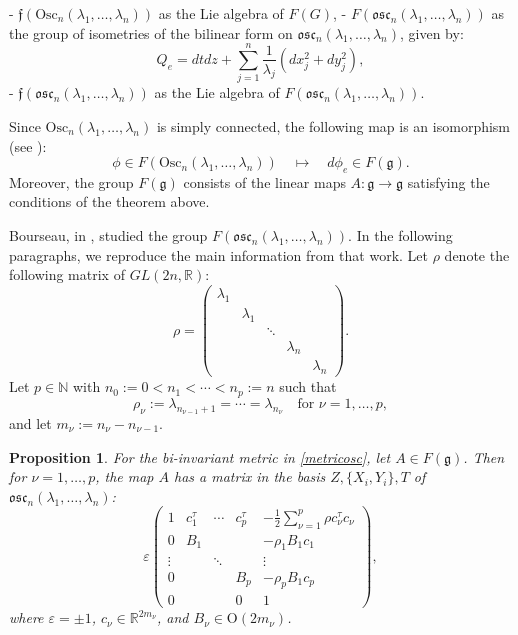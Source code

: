 \documentclass[12pt]{amsart}
\theoremstyle{plain}
\newtheorem{prop}[thm]{Proposition}
\theoremstyle{definition}
\theoremstyle{remark}
\begin{document}
- \( \mathfrak{f}(\text{Osc}_n(\lambda_1, \ldots, \lambda_n)) \) as the Lie algebra of \( F(G) \),
- \( F(\mathfrak{osc}_n(\lambda_1, \ldots, \lambda_n)) \) as the group of isometries of the bilinear form on \( \mathfrak{osc}_n(\lambda_1, \ldots, \lambda_n) \), given by:
\[
Q_e = dtdz + \sum_{j=1}^n \frac{1}{\lambda_j}(dx_j^2 + dy_j^2),
\]
- \( \mathfrak{f}(\mathfrak{osc}_n(\lambda_1, \ldots, \lambda_n)) \) as the Lie algebra of \( F(\mathfrak{osc}_n(\lambda_1, \ldots, \lambda_n)) \).

Since \( \text{Osc}_n(\lambda_1, \ldots, \lambda_n) \) is simply connected, the following map is an isomorphism (see \cite{MU}):
\[
\phi \in F(\text{Osc}_n(\lambda_1, \ldots, \lambda_n)) \quad \mapsto \quad d\phi_e \in F(\mathfrak{g}).
\]
Moreover, the group \( F(\mathfrak{g}) \) consists of the linear maps \( A: \mathfrak{g} \to \mathfrak{g} \) satisfying the conditions of the theorem above.

Bourseau, in \cite{Bou}, studied the group \( F(\mathfrak{osc}_n(\lambda_1, \ldots, \lambda_n)) \). In the following paragraphs, we reproduce the main information from that work. Let \( \rho \) denote the following matrix of \( GL(2n, \mathbb{R}) \):
\[
\rho = \left( 
\begin{matrix} 
\lambda_1 & & & & \\
& \lambda_1 &   & &\\
& & \ddots & & \\
& & & \lambda_n & \\
& & & & \lambda_n
\end{matrix}\right).
\]
Let \( p \in \mathbb{N} \) with \( n_0 := 0 < n_1 < \cdots < n_p := n \) such that
\[
\rho_{\nu} := \lambda_{n_{\nu - 1} + 1} = \cdots = \lambda_{n_{\nu}} \quad \text{for } \nu = 1, \ldots, p,
\]
and let \( m_{\nu} := n_{\nu} - n_{\nu - 1} \).

\begin{prop}
    For the bi-invariant metric in \eqref{metricosc}, let \( A \in F(\mathfrak{g}) \). Then for \( \nu = 1, \ldots, p \), the map \( A \) has a matrix in the basis \( Z, \{X_i, Y_i\}, T \) of \( \mathfrak{osc}_n(\lambda_1, \ldots, \lambda_n) \):
    \[
    \varepsilon  \left( 
    \begin{matrix} 
        1 & c_1^{\tau} & \cdots & c_p^{\tau} & -\frac{1}{2} \sum_{\nu=1}^p \rho c_{\nu}^{\tau} c_{\nu} \\
        0 & B_1 & & & -\rho_1 B_1 c_1 \\
        \vdots & & \ddots & & \vdots \\
        0 & & & B_p & -\rho_p B_1 c_p \\
        0 & & & 0 & 1
    \end{matrix}\right),
    \]
    where \( \varepsilon = \pm 1 \), \( c_{\nu} \in \mathbb{R}^{2m_{\nu}} \), and \( B_{\nu} \in \mathrm{O}(2 m_{\nu}) \).
\end{prop}
\end{document}
